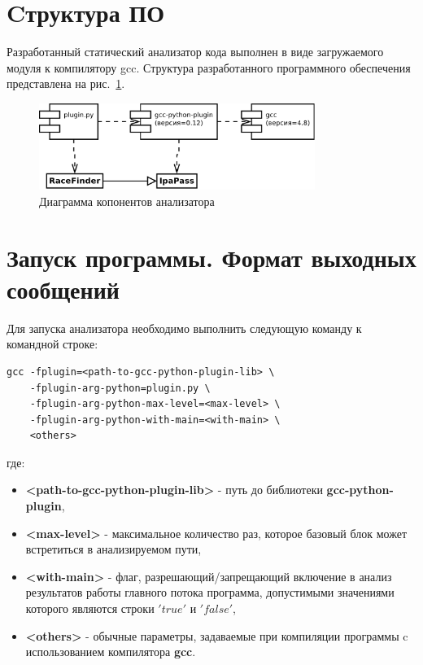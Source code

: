 \section{Cтруктура ПО}

Разработанный статический анализатор кода выполнен в виде загружаемого модуля к компилятору gcc. Структура разработанного программного обеспечения представлена на рис.~\ref{fig:components}.

\begin{figure}
  \centering
  \includegraphics[width=0.8\textwidth]{inc/dia/components}
  \caption{Диаграмма копонентов анализатора}
  \label{fig:components}
\end{figure}

\section{Запуск программы. Формат выходных сообщений}

Для запуска анализатора необходимо выполнить следующую команду к командной строке:
\begin{verbatim}
gcc -fplugin=<path-to-gcc-python-plugin-lib> \
    -fplugin-arg-python=plugin.py \
    -fplugin-arg-python-max-level=<max-level> \
    -fplugin-arg-python-with-main=<with-main> \
    <others>
\end{verbatim}
где:
\begin{itemize}
  \item \textbf{<path-to-gcc-python-plugin-lib>} - путь до библиотеки \textbf{gcc-python-plugin},
  \item \textbf{<max-level>} - максимальное количество раз, которое базовый блок может встретиться в анализируемом пути,
  \item \textbf{<with-main>} - флаг, разрешающий/запрещающий включение в анализ результатов работы главного потока программа, допустимыми значениями которого являются строки $'true'$ и $'false'$,
  \item \textbf{<others>} - обычные параметры, задаваемые при компиляции программы c использованием компилятора \textbf{gcc}.
\end{itemize}

